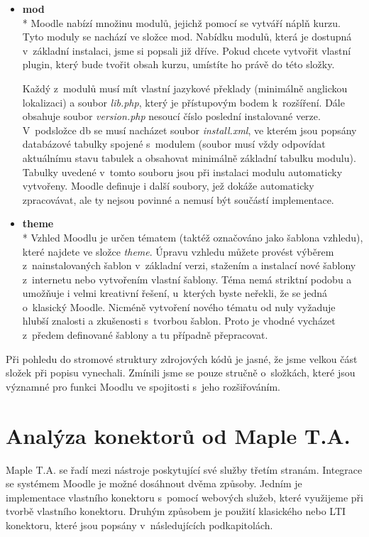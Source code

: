 \documentclass[
print,
  11pt,
  table,   
  nolof,    
  nolot,
  oneside,final
]{fithesis3}
\begin{document}
\begin{itemize}
\item \textbf{mod} \\*
Moodle nabízí množinu modulů, jejichž pomocí se vytváří náplň kur\-zu. Tyto moduly se nachází ve složce mod. Nabídku modulů, která je dostupná v~základní instalaci, jsme si popsali již dříve. Pokud chcete vytvořit vlastní plugin, který bude tvořit obsah kurzu, umístíte ho právě do této složky. 

Každý z~modulů musí mít vlastní jazykové překlady (minimálně anglickou lokalizaci) a soubor \emph{lib.php}, který je přístupovým bodem k~rozšíření. Dále obsahuje soubor \emph{version.php} nesoucí číslo poslední instalované verze. V~podsložce db se musí nacházet soubor \emph{install.xml}, ve kterém jsou popsány databázové tabulky spojené s~modulem (soubor musí vždy odpovídat aktuálnímu stavu tabulek a obsahovat minimálně základní tabulku modulu). Tabulky uvedené v~tomto souboru jsou při instalaci modulu automaticky vytvořeny. Moodle definuje i další soubory, jež dokáže automaticky zpracovávat, ale ty nejsou povinné a nemusí být součástí implementace.

\item \textbf{theme} \\*
Vzhled Moodlu je určen tématem (taktéž označováno jako šablona vzhledu), které najdete ve složce \emph{theme}. Úpravu vzhledu můžete provést výběrem z~nainstalovaných šablon v~základní verzi, stažením a instalací nové šablony z~internetu nebo vytvořením vlastní šablony. Téma nemá striktní podobu a umožňuje i velmi kreativní řešení, u~kterých byste neřekli, že se jedná o~klasický Moodle. Nicméně vytvoření nového tématu od nuly vyžaduje hlubší znalosti a zkušenosti s~tvorbou šablon. Proto je vhodné vycházet z~předem definované šablony a tu případně přepracovat. 
\end{itemize}
Při pohledu do stromové struktury zdrojových kódů je jasné, že jsme velkou část složek při popisu vynechali. Zmínili jsme se pouze stručně o~složkách, které jsou významné pro funkci Moodlu ve spojitosti s~jeho rozšiřováním.

	\section{Analýza konektorů od Maple T.A.}
Maple T.A. se řadí mezi nástroje poskytující své služby třetím stranám. Integrace se systémem Moodle je možné dosáhnout dvěma způsoby. Jedním je implementace vlastního konektoru s~pomocí webových služeb, které využijeme při tvorbě vlastního konektoru. Druhým způsobem je použití klasického nebo LTI konektoru, které jsou popsány v~následujících podkapitolách. 
\end{document}
